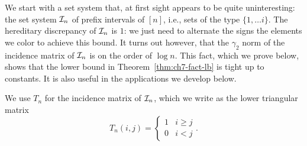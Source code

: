 We start with a set system that, at first sight appears to be quite
uninteresting: the set system $\mathcal{I}_n$ of prefix intervals  of $[n]$, i.e., sets
of the type $\{1, \ldots i\}$. The hereditary discrepancy of $\mathcal{I}_n$
is $1$: we just need to alternate the signs the elements we color to
achieve this bound. It turns out however, that the $\gamma_2$ norm of
the incidence matrix of $\mathcal{I}_n$ is on the order of $\log
n$. This fact, which we prove below, shows that the lower bound in 
Theorem~\ref{thm:ch7-fact-lb} is tight up to constants. It is also
useful in the applications we develop below.

We use $T_n$ for the incidence matrix of $\mathcal{I}_n$, which we
write as the lower triangular matrix
\[
T_n(i,j) =
\begin{cases}
  1 &i \ge j\\
  0 &i < j
\end{cases}.
\]

